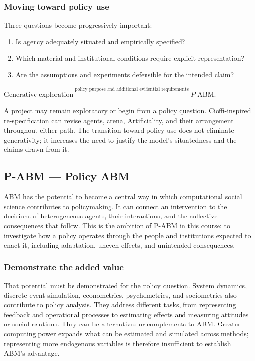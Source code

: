 \documentclass[11pt,a4paper]{article}
\newenvironment{fitdisplay}{\par\medskip\noindent\begin{lrbox}{\displaybox}$\displaystyle}{%
$\end{lrbox}\makebox[\linewidth][c]{\ifdim\wd\displaybox>\linewidth\resizebox{\linewidth}{!}{\usebox{\displaybox}}\else\usebox{\displaybox}\fi}\par\medskip}
\begin{document}
\subsubsection{Moving toward policy use}
Three questions become progressively important:
\begin{enumerate}
\item Is agency adequately situated and empirically specified?
\item Which material and institutional conditions require explicit representation?
\item Are the assumptions and experiments defensible for the intended claim?
\end{enumerate}

\begin{fitdisplay}
\text{Generative exploration}
\xrightarrow{\text{policy purpose and additional evidential requirements}}
P\text{-ABM}.
\end{fitdisplay}
A project may remain exploratory or begin from a policy question. Cioffi-inspired re-specification can revise agents, arena, Artificiality, and their arrangement throughout either path. The transition toward policy use does not eliminate generativity; it increases the need to justify the model's situatedness and the claims drawn from it.

\subsection{P-ABM --- Policy ABM}

ABM has the potential to become a central way in which computational social science contributes to policymaking. It can connect an intervention to the decisions of heterogeneous agents, their interactions, and the collective consequences that follow. This is the ambition of P-ABM in this course: to investigate how a policy operates through the people and institutions expected to enact it, including adaptation, uneven effects, and unintended consequences.

\subsubsection{Demonstrate the added value}

That potential must be demonstrated for the policy question. System dynamics, discrete-event simulation, econometrics, psychometrics, and sociometrics also contribute to policy analysis. They address different tasks, from representing feedback and operational processes to estimating effects and measuring attitudes or social relations. They can be alternatives or complements to ABM. Greater computing power expands what can be estimated and simulated across methods; representing more endogenous variables is therefore insufficient to establish ABM's advantage.
\end{document}
